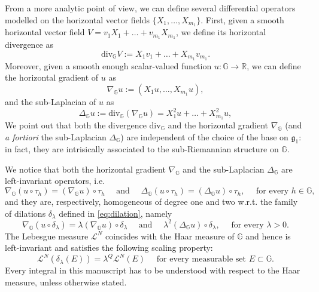 \documentclass[11pt]{amsart}
\numberwithin{equation}{section} %
\theoremstyle{definition}
\newcommand{\mfk}{\mathfrak}
\def\g{\mfk{g}}
\newcommand{\cor}{\textit}
\begin{document}
From a more analytic point of view, we can define several differential operators modelled on the horizontal vector fields
$\{X_1,\ldots, X_{m_1}\}$. 
First, given a smooth horizontal vector field $V=v_1 X_1 + \ldots + v_{m_1}X_{m_1}$, we define its horizontal divergence as
\begin{equation}\label{eq:horizontal_divergence}
	\mathrm{div}_{\mathbb{G}}V := X_{1}v_1 + \ldots + X_{m_1}v_{m_1}.
\end{equation}
Moreover, given a smooth enough scalar-valued function $u:\mathbb{G}\to \mathbb{R}$, we can define
the horizontal gradient of $u$ as
\begin{equation}\label{eq:Horizontal_grad}
	\nabla_{\mathbb{G}}u := (X_{1}u, \ldots, X_{m_1}u),
\end{equation}
\noindent and the sub-Laplacian of $u$ as
\begin{equation}\label{eq:horizontal_lap}
	\Delta_{\mathbb{G}}u := \mathrm{div}_{\mathbb{G}}(\nabla_{\mathbb{G}}u) = X_1^2 u + \ldots + X_{m_1}^{2} u,
\end{equation}
We point out that both the divergence $\mathrm{div}_{\mathbb{G}}$ and the horizontal gradient $\nabla_{\mathbb{G}}$ (and \cor{a fortiori} the sub-Laplacian $\Delta_{\mathbb{G}}$)
are independent of the choice of the base on $\g_1$: in fact, they are intrisically
associated to the sub-Riemannian structure on $\mathbb{G}$.

We notice that both the horizontal gradient $\nabla_{\mathbb{G}}$ and the sub-Laplacian $\Delta_{\mathbb{G}}$ are left-invariant operators, i.e.
\begin{equation}
	\nabla_{\mathbb{G}}(u\circ \tau_{h}) = (\nabla_{\mathbb{G}}u)\circ \tau_{h} \quad \textrm{ and } \quad \Delta_{\mathbb{G}}(u \circ \tau_{h}) = (\Delta_{\mathbb{G}}u)\circ \tau_{h}, \quad \textrm{ for every } h \in \mathbb{G},
\end{equation}
\noindent and they are, respectively, homogeneous of degree one and two w.r.t. the family of dilations $\delta_{\lambda}$ defined in \eqref{eq:dilation}, namely
\begin{equation}
	\nabla_{\mathbb{G}}(u\circ \delta_{\lambda})= \lambda (\nabla_{\mathbb{G}}u)\circ \delta_{\lambda} \quad \textrm{ and } \quad \lambda^{2}(\Delta_{\mathbb{G}}u)\circ \delta_{\lambda}, \quad \textrm{ for every } \lambda >0.
\end{equation}
The Lebesgue measure $\mathcal{L}^{N}$ coincides with the Haar measure of $\mathbb{G}$ and hence is left-invariant and satisfies the following scaling property:
\begin{equation}
	\mathcal{L}^{N}(\delta_{\lambda}(E)) = \lambda^{Q} \mathcal{L}^{N}(E) \quad \textrm{ for every measurable set } E \subset \mathbb{G}.	
\end{equation}
Every integral in this manuscript has to be understood
with respect to the Haar measure, unless otherwise stated.
\end{document}
